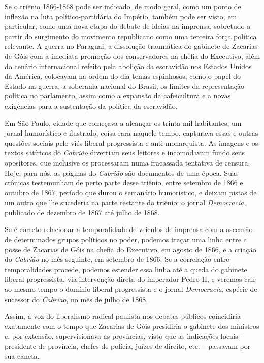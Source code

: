 Se o triênio 1866-1868 pode ser indicado, de modo geral, como um ponto
de inflexão na luta político-partidária do Império, também pode ser
visto, em particular, como uma nova etapa do debate de ideias na
imprensa, sobretudo a partir do surgimento do movimento republicano como
uma terceira força política relevante. A guerra no Paraguai, a
dissolução traumática do gabinete de Zacarias de Góis com a imediata
promoção dos conservadores na chefia do Executivo, além do cenário
internacional refeito pela abolição da escravidão nos Estados Unidos da
América, colocavam na ordem do dia temas espinhosos, como o papel do
Estado na guerra, a soberania nacional do Brasil, os limites da
representação política no parlamento, assim como a expansão da
cafeicultura e a novas exigências para a sustentação da política da
escravidão.

Em São Paulo, cidade que começava a alcançar os trinta mil habitantes,
um jornal humorístico e ilustrado, coisa rara naquele tempo, capturava
essas e outras questões sociais pelo viés liberal-progressista e
anti-monarquista. As imagens e os textos satíricos do \emph{Cabrião}
divertiam seus leitores e incomodavam fundo seus opositores, que
inclusive os processaram numa fracassada tentativa de censura. Hoje,
para nós, as páginas do \emph{Cabrião} são documentos de uma época. Suas
crônicas testemunham de perto parte desse triênio, entre setembro de
1866 e outubro de 1867, período que durou o semanário humorístico, e
deixam pistas de um outro que lhe sucederia na parte restante do
triênio: o jornal \emph{Democracia}, publicado de dezembro de 1867 até
julho de 1868.

Se é correto relacionar a temporalidade de veículos de imprensa com a
ascensão de determinados grupos políticos no poder, podemos traçar uma
linha entre a posse de Zacarias de Góis na chefia do Executivo, em
agosto de 1866, e a criação do \emph{Cabrião} no mês seguinte, em
setembro de 1866. Se a correlação entre temporalidades procede, podemos
estender essa linha até a queda do gabinete liberal-progressista, via
intervenção direta do imperador Pedro II, e veremos cair ao mesmo tempo
o domínio liberal-progressista e o jornal \emph{Democracia}, espécie de
sucessor do \emph{Cabrião}, no mês de julho de 1868.

Assim, a voz do liberalismo radical paulista nos debates públicos
coincidiria exatamente com o tempo que Zacarias de Góis presidiria o
gabinete dos ministros e, por extensão, supervisionava as províncias,
visto que as indicações locais -- presidente de província, chefes de
polícia, juízes de direito, etc. -- passavam por sua caneta.

